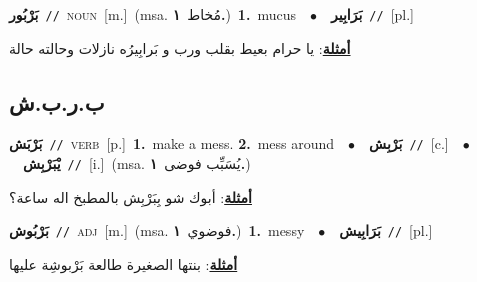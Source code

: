 \documentclass[10pt,a4paper,twoside]{article} %
\begin{document}
\begin{multicols}{2}
{\setlength\topsep{0pt}\textbf{\foreignlanguage{arabic}{بَرْبُور}}\ {\color{gray}\texttt{//}\color{black}}\ \textsc{noun}\ [m.]\ \color{gray}(msa. \foreignlanguage{arabic}{مُخاط}~\foreignlanguage{arabic}{\textbf{١.}})\color{black}\ \textbf{1.}~mucus\ \ $\bullet$\ \ \setlength\topsep{0pt}\textbf{\foreignlanguage{arabic}{بَرَابِير}}\ {\color{gray}\texttt{//}\color{black}}\ [pl.]\  \begin{flushright}\color{gray}\foreignlanguage{arabic}{\textbf{\underline{\foreignlanguage{arabic}{أمثلة}}}: يا حرام بعيط بقلب ورب و بَرابِيرُه نازلات وحالته حالة}\end{flushright}\color{black}} \vspace{2mm}

\vspace{-3mm}
\subsection*{\color{blue}\foreignlanguage{arabic}{ب.ر.ب.ش}\color{blue}{}} 

{\setlength\topsep{0pt}\textbf{\foreignlanguage{arabic}{بَرْبَش}}\ {\color{gray}\texttt{//}\color{black}}\ \textsc{verb}\ [p.]\ \textbf{1.}~make a mess.  \textbf{2.}~mess around\ \ $\bullet$\ \ \setlength\topsep{0pt}\textbf{\foreignlanguage{arabic}{بَرْبِش}}\ {\color{gray}\texttt{//}\color{black}}\ [c.]\ \ $\bullet$\ \ \setlength\topsep{0pt}\textbf{\foreignlanguage{arabic}{يْبَرْبِش}}\ {\color{gray}\texttt{//}\color{black}}\ [i.]\ \color{gray}(msa. \foreignlanguage{arabic}{يُسَبِّب فوضى}~\foreignlanguage{arabic}{\textbf{١.}})\color{black}\  \begin{flushright}\color{gray}\foreignlanguage{arabic}{\textbf{\underline{\foreignlanguage{arabic}{أمثلة}}}: أبوك شو بِبَرْبِش بالمطبخ اله ساعة؟}\end{flushright}\color{black}} \vspace{2mm}

{\setlength\topsep{0pt}\textbf{\foreignlanguage{arabic}{بَرْبُوش}}\ {\color{gray}\texttt{//}\color{black}}\ \textsc{adj}\ [m.]\ \color{gray}(msa. \foreignlanguage{arabic}{فوضوي}~\foreignlanguage{arabic}{\textbf{١.}})\color{black}\ \textbf{1.}~messy\ \ $\bullet$\ \ \setlength\topsep{0pt}\textbf{\foreignlanguage{arabic}{بَرَابِيش}}\ {\color{gray}\texttt{//}\color{black}}\ [pl.]\  \begin{flushright}\color{gray}\foreignlanguage{arabic}{\textbf{\underline{\foreignlanguage{arabic}{أمثلة}}}: بنتها الصغيرة طالعة بَرْبوشِة عليها}\end{flushright}\color{black}} \vspace{2mm}


\end{multicols}
\end{document}
